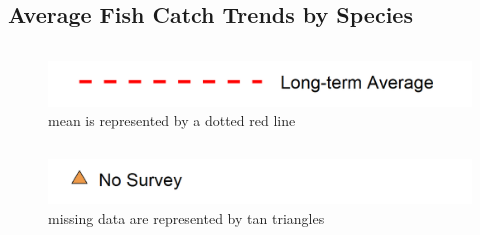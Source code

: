 \documentclass[
]{book}
\begin{document}
\hypertarget{average-fish-catch-trends-by-species}{%
\subsection{Average Fish Catch Trends by Species}\label{average-fish-catch-trends-by-species}}

\begin{columns-nocenter}

\begin{column}

\begin{figure}
\includegraphics[width=15.25in]{figures/mline} \caption{mean is represented by a dotted red line}\label{fig:unnamed-chunk-74}
\end{figure}

\end{column}

\begin{column}

\begin{figure}
\includegraphics[width=15.25in]{figures/mpoint} \caption{missing data are represented by tan triangles}\label{fig:unnamed-chunk-75}
\end{figure}

\end{column}

\begin{column}

\end{column}

\end{columns-nocenter}
\end{document}
